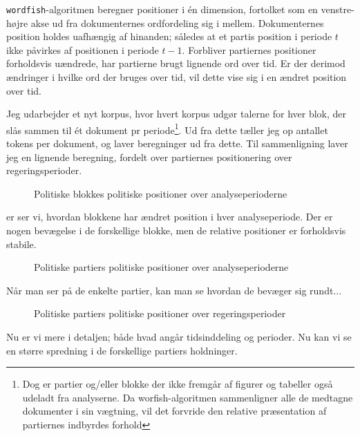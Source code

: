 \texttt{wordfish}-algoritmen beregner positioner i én dimension, fortolket som en venstre-højre akse ud fra dokumenternes ordfordeling sig i mellem.
Dokumenternes position holdes uafhængig af hinanden; således at et partis position i periode $t$ ikke påvirkes af positionen i periode $t-1$.
Forbliver partiernes positioner forholdsvis uændrede, har partierne brugt lignende ord over tid.
Er der derimod ændringer i hvilke ord der bruges over tid, vil dette vise sig i en ændret position over tid.

Jeg udarbejder et nyt korpus, hvor hvert korpus udgør talerne for hver blok, der slås sammen til ét dokument pr periode\footnote{Dog er partier og/eller blokke der ikke fremgår af figurer og tabeller også udeladt fra analyserne. Da worfish-algoritmen sammenligner alle de medtagne dokumenter i sin vægtning, vil det forvride den relative præsentation af partiernes indbyrdes forhold}.
Ud fra dette tæller jeg op antallet tokens per dokument, og laver beregninger ud fra dette.
Til sammenligning laver jeg en lignende beregning, fordelt over partiernes positionering over regeringsperioder.

\begin{figure}
  
\caption{Politiske blokkes politiske positioner over analyseperioderne}
\label{fig:fish_blocXperiod}
\end{figure}
er ser vi, hvordan blokkene har ændret position i hver analyseperiode.
Der er nogen bevægelse i de forskellige blokke, men de relative positioner er forholdsvis stabile.

\begin{figure}
  
\caption{Politiske partiers politiske positioner over analyseperioderne}
\label{fig:fish_partyXperiod}
\end{figure}

Når man ser på de enkelte partier, kan man se hvordan de bevæger sig rundt...

\begin{figure}
\begin{adjustwidth}{-8em}{-8em}
  
\end{adjustwidth}
\caption{Politiske partiers politiske positioner over regeringsperioder}
\label{fig:fish_partyXgovt}
\end{figure}
Nu er vi mere i detaljen; både hvad angår tidsinddeling og perioder. Nu kan vi se en større spredning i de forskellige partiers holdninger.

